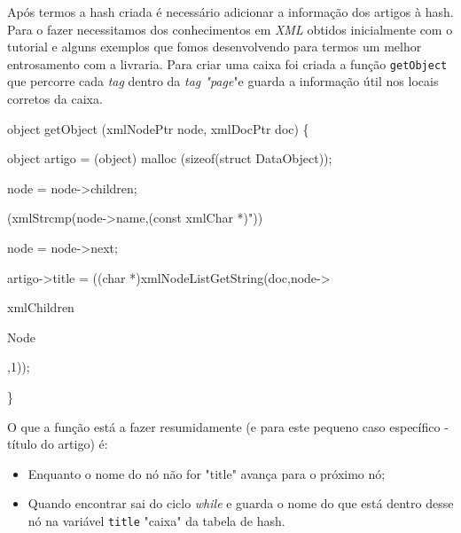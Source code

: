 \documentclass[a4paper,12pt]{report}
\newcommand\tab[1][1cm]{\hspace*{#1}}
\begin{document}
Após termos a hash criada é necessário adicionar a informação dos artigos à hash. Para o fazer necessitamos dos conhecimentos em {\sl XML} obtidos inicialmente com o tutorial e alguns exemplos que fomos desenvolvendo para termos um melhor entrosamento com a livraria. Para criar uma caixa foi criada a função {\tt getObject} que percorre cada {\sl tag} dentro da {\sl tag "page}"\space e guarda a informação útil nos locais corretos da caixa.

\begin{tcolorbox}[width=\textwidth,colback={darkgray},title={\sf Excerto 3.2: Exemplo da {\tt getObject} para guardar o título do artigo.},outer arc=2mm,colupper=white]{\footnotesize\tt
		
	object {\color{lightblue}getObject} (xmlNodePtr node, xmlDocPtr doc) \{

		\tab object artigo {\color{newpink}=} (object) {\color{lightblue}malloc} ({\color{newpink}sizeof}({\color{newpink}struct} DataObject));

		\tab node {\color{newpink}=} node->{\color{deadred}children};

        \tab {\color{darkgray}.}
		
		\tab {\color{gray}//Título do artigo }
		
		\tab {\color{newpink}while}({\color{lightblue}xmlStrcmp}(node->{\color{deadred}name},({\color{newpink}const} xmlChar {\color{newpink}*}){\color{deadgreen}{"title}}\color{deadgreen}"\color{white}))
		
		\tab \tab node {\color{newpink}=} node->{\color{deadred}next};
		
		\tab artigo->{\color{deadred}title} {\color{newpink}=} (({\color{newpink}char *}){\color{lightblue}xmlNodeListGetString}(doc,node->{\color{deadred}xmlChildren
			
	    Node},{\color{deadorange}1}));

		\tab {\color{gray}...}
		
\}		 
}
\end{tcolorbox} 

O que a função está a fazer resumidamente (e para este pequeno caso específico - título do artigo) é:
\begin{itemize}
	\setlength\itemsep{0.00001em}
	\item Enquanto o nome do nó não for "title" avança para o próximo nó; 
	\item Quando encontrar sai do ciclo {\sl while} e guarda o nome do que está dentro desse nó na variável {\tt title}  "caixa" da tabela de hash.
\end{itemize}
\end{document}
